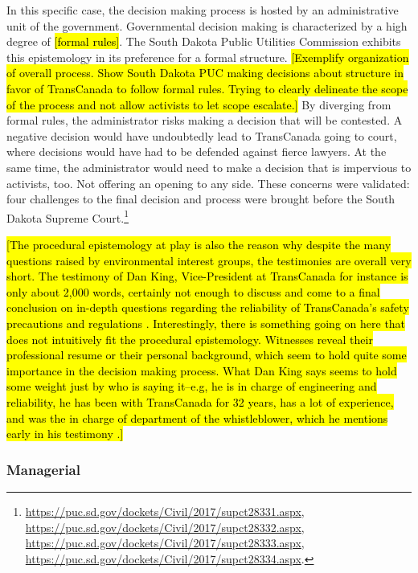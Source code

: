 \documentclass{article}
\begin{document}
	In this specific case, the decision making process is hosted by an administrative unit of the government. Governmental decision making is characterized by a high degree of \hl{[formal rules]}. The South Dakota Public Utilities Commission exhibits this epistemology in its preference for a formal structure. \hl{[Exemplify organization of overall process. Show South Dakota PUC making decisions about structure in favor of TransCanada to follow formal rules. Trying to clearly delineate the scope of the process and not allow activists to let scope escalate.]} By diverging from formal rules, the administrator risks making a decision that will be contested. A negative decision would have undoubtedly lead to TransCanada going to court, where decisions would have had to be defended against fierce lawyers. At the same time, the administrator would need to make a decision that is impervious to activists, too. Not offering an opening to any side. These concerns were validated: four challenges to the final decision and process were brought before the South Dakota Supreme Court.\footnote{
		\url{https://puc.sd.gov/dockets/Civil/2017/supct28331.aspx}, 
		\url{https://puc.sd.gov/dockets/Civil/2017/supct28332.aspx}, 
		\url{https://puc.sd.gov/dockets/Civil/2017/supct28333.aspx}, 
		\url{https://puc.sd.gov/dockets/Civil/2017/supct28334.aspx}.
	}

	\hl{[The procedural epistemology at play is also the reason why despite the many questions raised by environmental interest groups, the testimonies are overall very short. The testimony of Dan King, Vice-President at TransCanada for instance is only about 2,000 words, certainly not enough to discuss and come to a final conclusion on in-depth questions regarding the reliability of TransCanada's safety precautions and regulations \mbox{\citep{King2015}}. Interestingly, there is something going on here that does not intuitively fit the procedural epistemology. Witnesses reveal their professional resume or their personal background, which seem to hold quite some importance in the decision making process. What Dan King says seems to hold some weight just by who is saying it--e.g, he is in charge of engineering and reliability, he has been with TransCanada for 32 years, has a lot of experience, and was the in charge of department of the whistleblower, which he mentions early in his testimony \mbox{\citep[][p. 2]{King2015}}.]}

	\subsubsection*{Managerial}
\end{document}
